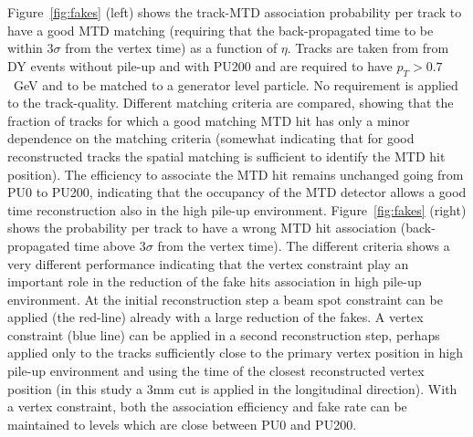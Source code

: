 Figure~\ref{fig:fakes} (left) shows the track-MTD association probability per track to have a good MTD matching (requiring that the back-propagated  time to be within 3$\sigma$ from the vertex time) as a function of $\eta$. Tracks are taken from  from DY events without pile-up and with PU200 and are required to have $p_{T}>0.7$~GeV and to be matched to a generator level particle. No requirement is applied to the track-quality. Different matching criteria are compared, showing that the fraction of tracks for which a good matching MTD hit has only a minor dependence on the matching criteria (somewhat indicating that for good reconstructed tracks the spatial matching is sufficient to identify the MTD hit position). The efficiency to associate the MTD hit remains unchanged going from PU0 to PU200, indicating that the occupancy of the MTD detector allows a good time reconstruction also in the high pile-up environment.   Figure~\ref{fig:fakes} (right) shows the probability per track to have a wrong MTD hit association (back-propagated time above 3$\sigma$ from the vertex time). The different criteria shows a very different performance indicating that the vertex constraint play an important role in the reduction of the fake hits association in high pile-up environment. At the initial reconstruction step a beam spot constraint can be applied (the red-line) already with a large reduction of the fakes. A vertex constraint (blue line) can be applied in a second reconstruction step, perhaps applied only to the tracks sufficiently close to the primary vertex position in high pile-up environment and using the time of the closest reconstructed vertex position (in this study a 3mm cut is applied in the longitudinal direction). With a vertex constraint, both the association efficiency and fake rate can be maintained to levels which are close between PU0 and PU200.

